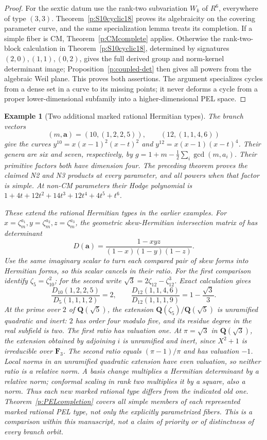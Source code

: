 \documentclass[10pt,reqno]{article}
\theoremstyle{emphasizedplain}
\theoremstyle{emphasizeddefinition}
\newtheorem{example}[theorem]{Example}
\theoremstyle{emphasizeddefinition}
\newcommand{\Q}{\mathbf Q}
\begin{document}
\begin{proof}
For the sextic datum use the rank-two subvariation $W_k$ of $R^6$,
everywhere of type $(3,3)$. Theorem~\ref{p:S10cyclic18} proves its
algebraicity on the covering parameter curve, and the same
specialization lemma treats its completion. If a simple fiber is CM,
Theorem~\ref{p:CMcomplete} applies. Otherwise the rank-two-block
calculation in Theorem~\ref{p:S10cyclic18}, determined by signatures
$(2,0),(1,1),(0,2)$, gives the full derived group and norm-kernel
determinant image; Proposition~\ref{p:coupled-det} then gives all powers
from the algebraic Weil plane. This proves both assertions.
The argument specializes cycles from a dense set in a curve to its
missing points; it never deforms a cycle from a proper lower-dimensional
subfamily into a higher-dimensional PEL space.
\end{proof}

\begin{example}[Two additional marked rational Hermitian types]
\label{ex:weighted-newtypes}
The branch vectors
\[
 (m,\boldsymbol a)=(10,(1,2,2,5)),\qquad(12,(1,1,4,6))
\]
give the curves
$y^{10}=x(x-1)^2(x-t)^2$ and
$y^{12}=x(x-1)(x-t)^4$. Their genera are six and seven, respectively,
by $g=1+m-\frac12\sum_i\gcd(m,a_i)$. Their primitive factors both
have dimension four. The preceding theorem proves the claimed N2
and N3 products at every parameter, and all powers when that factor
is simple. At non-CM parameters their Hodge polynomial is
$1+4t+12t^2+14t^3+12t^4+4t^5+t^6$.

These extend the rational Hermitian types in the earlier examples.
For $x=\zeta_m^{a_1},y=\zeta_m^{a_2},z=\zeta_m^{a_3}$, the geometric
skew-Hermitian intersection matrix of \cite[Proposition 7.4]{YuZheng}
has determinant
\[
 D(\boldsymbol a)=\frac{1-xyz}{(1-x)(1-y)(1-z)}.
\]
Use the same imaginary scalar to turn each compared pair of skew
forms into Hermitian forms, so this scalar cancels in their ratio.
For the first comparison identify $\zeta_5=\zeta_{10}^2$; for the
second write $\sqrt3=2\zeta_{12}-\zeta_{12}^3$. Exact calculation gives
\[
 \frac{D_{10}(1,2,2,5)}{D_5(1,1,1,2)}=2,\qquad
 \frac{D_{12}(1,1,4,6)}{D_{12}(1,1,1,9)}
       =1-\frac{\sqrt3}{3}.
\]
At the prime over $2$ of $\Q(\sqrt5)$, the extension
$\Q(\zeta_5)/\Q(\sqrt5)$ is unramified quadratic and inert:
$2$ has order four modulo five, and its residue degree in the real
subfield is two. The first ratio has valuation one. At
$\pi=\sqrt3$ in $\Q(\sqrt3)$, the extension obtained by adjoining
$i$ is unramified and inert, since $X^2+1$ is irreducible over
$\mathbf F_3$. The second ratio equals $(\pi-1)/\pi$ and has
valuation $-1$. Local norms in an unramified quadratic extension
have even valuation, so neither ratio is a relative norm.
A basis change multiplies a Hermitian determinant by a relative norm;
conformal scaling in rank two multiplies it by a square, also a norm.
Thus each new marked rational type differs from the indicated old
one. Theorem~\ref{p:PELcompletion} covers all simple members of each
represented marked rational PEL type, not only the explicitly
parametrized fibers. This is a comparison within this manuscript,
not a claim of priority or of distinctness of every branch orbit.
\end{example}
\end{document}
